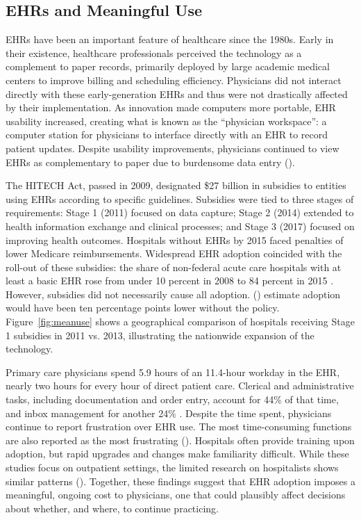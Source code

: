 \documentclass[12pt]{article}
\begin{document}
\subsection{EHRs and Meaningful Use}
EHRs have been an important feature of healthcare since the 1980s. Early in their existence, healthcare professionals perceived the technology as a complement to paper records, primarily deployed by large academic medical centers to improve billing and scheduling efficiency. Physicians did not interact directly with these early-generation EHRs and thus were not drastically affected by their implementation. As innovation made computers more portable, EHR usability increased, creating what is known as the ``physician workspace'': a computer station for physicians to interface directly with an EHR to record patient updates. Despite usability improvements, physicians continued to view EHRs as complementary to paper due to burdensome data entry (\cite{evans2016electronic}).

The HITECH Act, passed in 2009, designated \$27 billion in subsidies to entities using EHRs according to specific guidelines. Subsidies were tied to three stages of requirements: Stage 1 (2011) focused on data capture; Stage 2 (2014) extended to health information exchange and clinical processes; and Stage 3 (2017) focused on improving health outcomes. Hospitals without EHRs by 2015 faced penalties of lower Medicare reimbursements. Widespread EHR adoption coincided with the roll-out of these subsidies: the share of non-federal acute care hospitals with at least a basic EHR rose from under 10 percent in 2008 to 84 percent in 2015 \citep{henry2016adoption}. However, subsidies did not necessarily cause all adoption. \citeauthor{dranove2015investment} (\citeyear{dranove2015investment}) estimate adoption would have been ten percentage points lower without the policy. Figure~\ref{fig:meanuse} shows a geographical comparison of hospitals receiving Stage 1 subsidies in 2011 vs. 2013, illustrating the nationwide expansion of the technology.

Primary care physicians spend 5.9 hours of an 11.4-hour workday in the EHR, nearly two hours for every hour of direct patient care. Clerical and administrative tasks, including documentation and order entry, account for 44\% of that time, and inbox management for another 24\% \citep{arndt2017tethered}. Despite the time spent, physicians continue to report frustration over EHR use. The most time-consuming functions are also reported as the most frustrating (\cite{dymek2021building}). Hospitals often provide training upon adoption, but rapid upgrades and changes make familiarity difficult. While these studies focus on outpatient settings, the limited research on hospitalists shows similar patterns (\cite{tipping2010did}). Together, these findings suggest that EHR adoption imposes a meaningful, ongoing cost to physicians, one that could plausibly affect decisions about whether, and where, to continue practicing.
\end{document}
